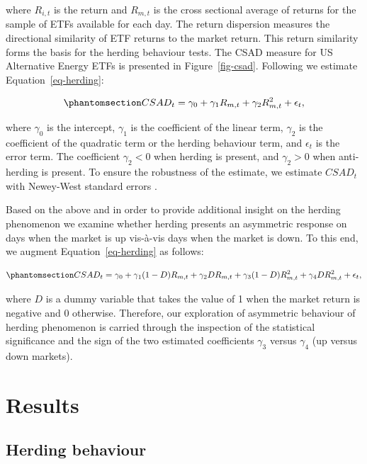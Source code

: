 \documentclass[
  letterpaper,
  DIV=11,
  numbers=noendperiod]{scrartcl}
\begin{document}
where \(R_{i,t}\) is the return and \(R_{m,t}\) is the cross sectional
average of returns for the sample of ETFs available for each day. The
return dispersion measures the directional similarity of ETF returns to
the market return. This return similarity forms the basis for the
herding behaviour tests. The CSAD measure for US Alternative Energy ETFs
is presented in Figure~\ref{fig-csad}. Following \citet{galariotis2015}
we estimate Equation~\ref{eq-herding}:

\begin{equation}\phantomsection\label{eq-herding}{
CSAD_t = \gamma_0 + \gamma_1 R_{m,t} + \gamma_2 R_{m,t}^2 + \epsilon_t,
}\end{equation}

where \(\gamma_0\) is the intercept, \(\gamma_1\) is the coefficient of
the linear term, \(\gamma_2\) is the coefficient of the quadratic term
or the herding behaviour term, and \(\epsilon_t\) is the error term. The
coefficient \(\gamma_2 <0\) when herding is present, and \(\gamma_2 >0\)
when anti-herding is present. To ensure the robustness of the estimate,
we estimate \(CSAD_{t}\) with Newey-West standard errors
\citep[See][]{newey1987}.

Based on the above and in order to provide additional insight on the
herding phenomenon we examine whether herding presents an asymmetric
response on days when the market is up vis-à-vis days when the market is
down. To this end, we augment Equation~\ref{eq-herding} as follows:

\begin{equation}\phantomsection\label{eq-asymmetry}{
CSAD_t = \gamma_0 + \gamma_1(1-D) R_{m,t} + \gamma_2D R_{m,t} + \gamma_3(1-D) R_{m,t}^2  + \gamma_4D R_{m,t}^2 + \epsilon_t,
}\end{equation}

where \(D\) is a dummy variable that takes the value of 1 when the
market return is negative and 0 otherwise. Therefore, our exploration of
asymmetric behaviour of herding phenomenon is carried through the
inspection of the statistical significance and the sign of the two
estimated coefficients \(\gamma_3\) versus \(\gamma_4\) (up versus down
markets).

\section{Results}\label{results}

\subsection{Herding behaviour}\label{herding-behaviour}
\end{document}
